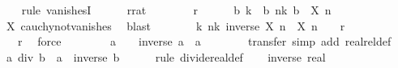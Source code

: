 \begin{isabellebody}
\ \ \isamarkupfalse%
\ {\isacharparenleft}{\kern0pt}rule\ vanishesI{\isacharparenright}{\kern0pt}\isanewline
\ \ \ \ \isamarkupfalse%
\ r{\isacharcolon}{\kern0pt}{\isacharcolon}{\kern0pt}rat\isanewline
\ \ \ \ \isamarkupfalse%
\ {\isachardoublequoteopen}{}\ {\isacharless}{\kern0pt}\ r{\isachardoublequoteclose}\isanewline
\ \ \ \ \isamarkupfalse%
\ b\ k\ \ {\isachardoublequoteopen}b{\isachargreater}{\kern0pt}{}{\isachardoublequoteclose}\ {\isachardoublequoteopen}{\isasymforall}n{\isasymge}k{\isachardot}{\kern0pt}\ b\ {\isacharless}{\kern0pt}\ {\isasymbar}X\ n{\isasymbar}{\isachardoublequoteclose}\isanewline
\ \ \ \ \ \ \isamarkupfalse%
\ X\ cauchy{\isacharunderscore}{\kern0pt}not{\isacharunderscore}{\kern0pt}vanishes\ \isamarkupfalse%
\ blast\isanewline
\ \ \ \ \isamarkupfalse%
\ \isamarkupfalse%
\ {\isachardoublequoteopen}{\isasymexists}k{\isachardot}{\kern0pt}\ {\isasymforall}n{\isasymge}k{\isachardot}{\kern0pt}\ {\isasymbar}inverse\ {\isacharparenleft}{\kern0pt}X\ n{\isacharparenright}{\kern0pt}\ {\isacharasterisk}{\kern0pt}\ X\ n\ {\isacharminus}{\kern0pt}\ {}{\isasymbar}\ {\isacharless}{\kern0pt}\ r{\isachardoublequoteclose}\ \isanewline
\ \ \ \ \ \ \isamarkupfalse%
\ {\isacartoucheopen}{}\ {\isacharless}{\kern0pt}\ r{\isacartoucheclose}\ \isamarkupfalse%
\ force\isanewline
\ \ \isamarkupfalse%
\isanewline
\ \ \isamarkupfalse%
\ \isamarkupfalse%
\ {\isachardoublequoteopen}a\ {\isasymnoteq}\ {}\ {\isasymLongrightarrow}\ inverse\ a\ {\isacharasterisk}{\kern0pt}\ a\ {\isacharequal}{\kern0pt}\ {}{\isachardoublequoteclose}\isanewline
\ \ \ \ \isamarkupfalse%
\ transfer\ {\isacharparenleft}{\kern0pt}simp\ add{\isacharcolon}{\kern0pt}\ realrel{\isacharunderscore}{\kern0pt}def{\isacharparenright}{\kern0pt}\isanewline
\ \ \isamarkupfalse%
\ {\isachardoublequoteopen}a\ div\ b\ {\isacharequal}{\kern0pt}\ a\ {\isacharasterisk}{\kern0pt}\ inverse\ b{\isachardoublequoteclose}\isanewline
\ \ \ \ \isamarkupfalse%
\ {\isacharparenleft}{\kern0pt}rule\ divide{\isacharunderscore}{\kern0pt}real{\isacharunderscore}{\kern0pt}def{\isacharparenright}{\kern0pt}\isanewline
\ \ \isamarkupfalse%
\ {\isachardoublequoteopen}inverse\ {\isacharparenleft}{\kern0pt}{}{\isacharcolon}{\kern0pt}{\isacharcolon}{\kern0pt}real{\isacharparenright}{\kern0pt}\ {\isacharequal}{\kern0pt}\ {}{\isachardoublequoteclose}\isanewline

\end{isabellebody}
